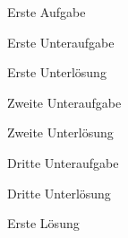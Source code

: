 \documentclass[a4paper]{article}
\begin{document}
\gradingtable

\begin{exercise}[
  subtitle={Erste Aufgabe},
  points={1+2}
]
    Erste Aufgabe
    \begin{enumerate}

        \begin{subexercise}[points={3}]
            Erste Unteraufgabe
        \end{subexercise}
        \begin{subsolution}
            Erste Unterlösung
        \end{subsolution}

        \begin{subexercise}
            Zweite Unteraufgabe
        \end{subexercise}
        \begin{subsolution}
            Zweite Unterlösung
        \end{subsolution}

        \begin{subexercise}[points={5}]
            Dritte Unteraufgabe
        \end{subexercise}
        \begin{subsolution}
            Dritte Unterlösung
        \end{subsolution}

    \end{enumerate}
\end{exercise}
\begin{solution}
    Erste Lösung
\end{solution}
\end{document}
